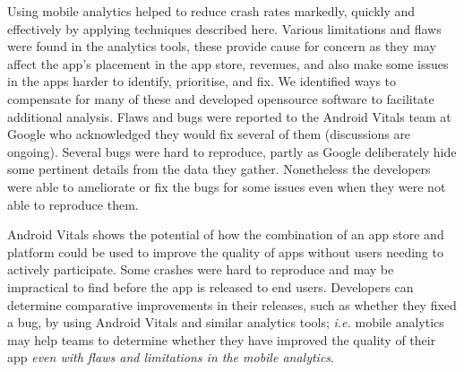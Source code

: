 \begin{SingleSpace}
Using mobile analytics helped to reduce crash rates markedly, quickly and effectively by applying techniques described here.
Various limitations and flaws were found in the analytics tools, these provide cause for concern as they may affect the app's placement in the app store, revenues, and also make some issues in the apps harder to identify, prioritise, and fix. We identified ways to compensate for many of these and developed opensource software to facilitate additional analysis. Flaws and bugs were reported to the Android Vitals team at Google who acknowledged they would fix several of them (discussions are ongoing).
Several bugs were hard to reproduce, partly as Google deliberately hide some pertinent details from the data they gather. Nonetheless the developers were able to ameliorate or fix the bugs for some issues even when they were not able to reproduce them.

Android Vitals shows the potential of how the combination of an app store and platform could be used to improve the quality of apps without users needing to actively participate. Some crashes were hard to reproduce and may be impractical to find before the app is released to end users. Developers can determine comparative improvements in their releases, such as whether they fixed a bug, by using Android Vitals and similar analytics tools; \textit{i.e.} mobile analytics may help teams to determine whether they have improved the quality of their app \textit{even with flaws and limitations in the mobile analytics}.
\end{SingleSpace}
\newpage
